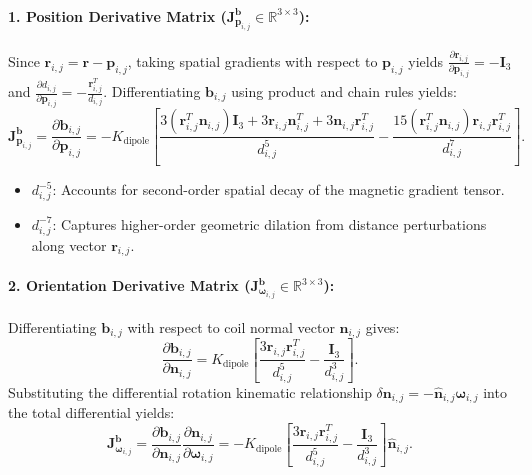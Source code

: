 \documentclass[11pt, a4paper]{article}
\begin{document}
\paragraph{1. Position Derivative Matrix ($\mathbf{J}_{\mathbf{p}_{i,j}}^{\mathbf{b}} \in \mathbb{R}^{3 \times 3}$):}
Since $\mathbf{r}_{i,j} = \mathbf{r} - \mathbf{p}_{i,j}$, taking spatial gradients with respect to $\mathbf{p}_{i,j}$ yields $\frac{\partial \mathbf{r}_{i,j}}{\partial \mathbf{p}_{i,j}} = -\mathbf{I}_3$ and $\frac{\partial d_{i,j}}{\partial \mathbf{p}_{i,j}} = -\frac{\mathbf{r}_{i,j}^T}{d_{i,j}}$. Differentiating $\mathbf{b}_{i,j}$ using product and chain rules yields:
\begin{equation}
    \mathbf{J}_{\mathbf{p}_{i,j}}^{\mathbf{b}} = \frac{\partial \mathbf{b}_{i,j}}{\partial \mathbf{p}_{i,j}} = -K_{\text{dipole}} \left[ \frac{3 (\mathbf{r}_{i,j}^T \mathbf{n}_{i,j}) \mathbf{I}_3 + 3 \mathbf{r}_{i,j} \mathbf{n}_{i,j}^T + 3 \mathbf{n}_{i,j} \mathbf{r}_{i,j}^T}{d_{i,j}^5} - \frac{15 (\mathbf{r}_{i,j}^T \mathbf{n}_{i,j}) \mathbf{r}_{i,j} \mathbf{r}_{i,j}^T}{d_{i,j}^7} \right].
\end{equation}
\begin{itemize}
    \item $d_{i,j}^{-5}$: Accounts for second-order spatial decay of the magnetic gradient tensor.
    \item $d_{i,j}^{-7}$: Captures higher-order geometric dilation from distance perturbations along vector $\mathbf{r}_{i,j}$.
\end{itemize}

\paragraph{2. Orientation Derivative Matrix ($\mathbf{J}_{\boldsymbol{\omega}_{i,j}}^{\mathbf{b}} \in \mathbb{R}^{3 \times 3}$):}
Differentiating $\mathbf{b}_{i,j}$ with respect to coil normal vector $\mathbf{n}_{i,j}$ gives:
\begin{equation}
    \frac{\partial \mathbf{b}_{i,j}}{\partial \mathbf{n}_{i,j}} = K_{\text{dipole}} \left[ \frac{3 \mathbf{r}_{i,j} \mathbf{r}_{i,j}^T}{d_{i,j}^5} - \frac{\mathbf{I}_3}{d_{i,j}^3} \right].
\end{equation}
Substituting the differential rotation kinematic relationship $\delta \mathbf{n}_{i,j} = -\hat{\mathbf{n}}_{i,j} \boldsymbol{\omega}_{i,j}$ into the total differential yields:
\begin{equation}
    \mathbf{J}_{\boldsymbol{\omega}_{i,j}}^{\mathbf{b}} = \frac{\partial \mathbf{b}_{i,j}}{\partial \mathbf{n}_{i,j}} \frac{\partial \mathbf{n}_{i,j}}{\partial \boldsymbol{\omega}_{i,j}} = -K_{\text{dipole}} \left[ \frac{3 \mathbf{r}_{i,j} \mathbf{r}_{i,j}^T}{d_{i,j}^5} - \frac{\mathbf{I}_3}{d_{i,j}^3} \right] \hat{\mathbf{n}}_{i,j}.
\end{equation}
\end{document}
